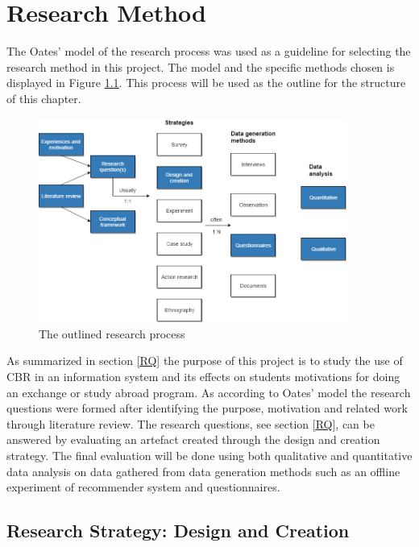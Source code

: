 
\chapter{Research Method}\label{chap:4}

The Oates'\cite{oates2005researching} model of the research process was used as a guideline for selecting the research method in this project. The model and the specific methods chosen is displayed in Figure \ref{fig:research_process}. This process will be used as the outline for the structure of this chapter.

\begin{figure}[H]
    \centering
    \includegraphics[width=0.9\textwidth]{fig/research_process.png}
    \caption{The outlined research process}
    \label{fig:research_process}
\end{figure}

As summarized in section \ref{RQ} the purpose of this project is to study the use of CBR in an information system and its effects on students motivations for doing an exchange or study abroad program. As according to Oates'\cite{oates2005researching} model the research questions were formed after identifying the purpose, motivation and related work through literature review. The research questions, see section \ref{RQ}, can be answered by evaluating an artefact created through the design and creation strategy. The final evaluation will be done using both qualitative and quantitative data analysis on data gathered from data generation methods such as an offline experiment of recommender system and questionnaires.

\section{Research Strategy: Design and Creation}

